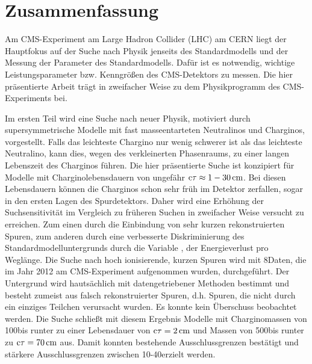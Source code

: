 \chapter*{Zusammenfassung}
Am CMS-Experiment am Large Hadron Collider (LHC) am CERN liegt der Hauptfokus auf der Suche nach Physik jenseits des Standardmodells und der Messung der Parameter des Standardmodells.
Daf\"{u}r ist es notwendig, wichtige Leistungsparameter bzw. Kenngr\"{o}{\ss}en des CMS-Detektors zu messen.
Die hier pr\"{a}sentierte Arbeit tr\"{a}gt in zweifacher Weise zu dem Physikprogramm des CMS-Experiments bei.

Im ersten Teil wird eine Suche nach neuer Physik, motiviert durch supersymmetrische Modelle mit fast masseentarteten Neutralinos und Charginos, vorgestellt.
Falls das leichteste Chargino nur wenig schwerer ist als das leichteste Neutralino, kann dies, wegen des verkleinerten Phasenraums, zu einer langen Lebenszeit des Charginos f\"{u}hren.
Die hier pr\"{a}sentierte Suche ist konzipiert f\"{u}r Modelle mit Charginolebensdauern von ungef\"{a}hr $\text{c}\tau\approx 1-30\,\text{cm}$.
Bei diesen Lebensdauern können die Charginos schon sehr fr\"{u}h im Detektor zerfallen, sogar in den ersten Lagen des Spurdetektors.
Daher wird eine Erh\"{o}hung der Suchsensitivit\"{a}t im Vergleich zu fr\"{u}heren Suchen in zweifacher Weise versucht zu erreichen.
Zum einen durch die Einbindung von sehr kurzen rekonstruierten Spuren, zum anderen durch eine verbesserte Diskriminierung des Standardmodelluntergrunds durch die Variable \dedx, der Energieverlust pro Wegl\"{a}nge.
Die Suche nach hoch ionisierende, kurzen Spuren wird mit 8\tev Daten, die im Jahr 2012 am CMS-Experiment aufgenommen wurden, durchgef\"{u}hrt.
Der Untergrund wird hauts\"{a}chlich mit datengetriebener Methoden bestimmt und besteht zumeist aus falsch rekonstruierter Spuren, d.h. Spuren, die nicht durch ein einziges Teilchen verursacht wurden.
Es konnte kein \"{U}berschuss beobachtet werden.
Die Suche schlie{\ss}t mit diesem Ergebnis Modelle mit Charginomassen von 100\gev bis runter zu einer Lebensdauer von $\text{c}\tau=2\,\text{cm}$ und Massen von 500\gev bis runter zu $\text{c}\tau=70\,\text{cm}$ aus.
Damit konnten bestehende Ausschlussgrenzen best\"{a}tigt und st\"{a}rkere Ausschlussgrenzen zwischen 10-40\gev erzielt werden.

